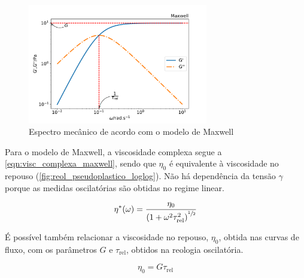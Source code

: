 			\begin{figure}[h]
				\centering
				\includegraphics[width=0.7\textwidth]{./imagens/reologia/modelo_maxwell}
				\caption{Espectro mecânico de acordo com o modelo de Maxwell}
				\label{fig:modelo_maxwell}
			\end{figure} 
			
			Para o modelo de Maxwell, a viscosidade complexa segue a \autoref{eqn:visc_complexa_maxwell}, sendo que \(\eta_0\) é equivalente à viscosidade no repouso (\autoref{fig:reol_pseudoplastico_loglog}). Não há dependência da tensão \(\gamma\) porque as medidas oscilatórias são obtidas no regime linear.\cite{Rehage1991}
			
			\begin{equation}
				 \eta^* (\omega) = \dfrac{\eta_0}{\left( 1 + \omega^2 \tau_\mathrm{rel}^2 \right)^{\sfrac{1}{2}}}
				\label{eqn:visc_complexa_maxwell}
			\end{equation} 
			
			É possível também relacionar a viscosidade no repouso, \(\eta_0\), obtida nas curvas de fluxo, com os parâmetros \(G\) e \(\tau_{\mathrm{rel}}\), obtidos na reologia oscilatória.\cite{Rehage1991} 
			
			\begin{equation}
				\eta_0 = G \tau_{\mathrm{rel}}
				\label{eqn:eta0_g0_taurel}
			\end{equation}  
			
			
